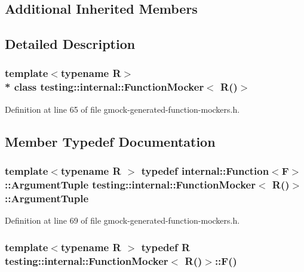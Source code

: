 \subsection*{Additional Inherited Members}


\subsection{Detailed Description}
\subsubsection*{template$<$typename R$>$\\*
class testing\+::internal\+::\+Function\+Mocker$<$ R()$>$}



Definition at line 65 of file gmock-\/generated-\/function-\/mockers.\+h.



\subsection{Member Typedef Documentation}
\subsubsection[{\texorpdfstring{Argument\+Tuple}{ArgumentTuple}}]{\setlength{\rightskip}{0pt plus 5cm}template$<$typename R $>$ typedef {\bf internal\+::\+Function}$<${\bf F}$>$\+::{\bf Argument\+Tuple} {\bf testing\+::internal\+::\+Function\+Mocker}$<$ {\bf R}()$>$\+::{\bf Argument\+Tuple}}\hypertarget{classtesting_1_1internal_1_1_function_mocker_3_01_r_07_08_4_a5a279e0d8414bf0809405c06a0725b66}{}\label{classtesting_1_1internal_1_1_function_mocker_3_01_r_07_08_4_a5a279e0d8414bf0809405c06a0725b66}


Definition at line 69 of file gmock-\/generated-\/function-\/mockers.\+h.

\subsubsection[{\texorpdfstring{F}{F}}]{\setlength{\rightskip}{0pt plus 5cm}template$<$typename R $>$ typedef {\bf R} {\bf testing\+::internal\+::\+Function\+Mocker}$<$ {\bf R}()$>$\+::F()}\hypertarget{classtesting_1_1internal_1_1_function_mocker_3_01_r_07_08_4_a2c1d7da413176d87405227df90a95521}{}\label{classtesting_1_1internal_1_1_function_mocker_3_01_r_07_08_4_a2c1d7da413176d87405227df90a95521}


